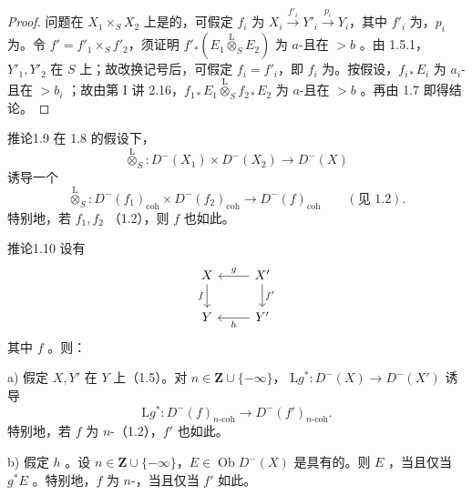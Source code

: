 \begin{proof}
问题在 $X_1\times_SX_2$ 上是的，可假定 $f_i$ 为 $X_i\xrightarrow{f'_i}Y'_i\xrightarrow{p_i}Y_i$，其中 $f'_i$ 为，$p_i$ 为。令 $f'=f'_1\times_Sf'_2$，须证明 $f'_*(E_1\mathbin{\overset{\mathrm L}{\otimes}}_SE_2)$ 为 $a$-且在 $>b$ 。由 1.5.1，$Y'_1,Y'_2$ 在 $S$ 上；故改换记号后，可假定 $f_i=f'_i$，即 $f_i$ 为。按假设，$f_{i*}E_i$ 为 $a_i$-且在 $>b_i$ ；故由第 I 讲 2.16，$f_{1*}E_1\mathbin{\overset{\mathrm L}{\otimes}}_Sf_{2*}E_2$ 为 $a$-且在 $>b$ 。再由 1.7 即得结论。
\end{proof}
\begin{SGAresult}{推论}{1.9}
在 1.8 的假设下，
\[\mathbin{\overset{\mathrm L}{\otimes}}_S:D^-(X_1)\times D^-(X_2)\longrightarrow D^-(X)\]
诱导一个
\[\mathbin{\overset{\mathrm L}{\otimes}}_S:D^-(f_1)_{\mathrm{coh}}\times D^-(f_2)_{\mathrm{coh}}\longrightarrow D^-(f)_{\mathrm{coh}}\qquad(\text{见 1.2}).\]
特别地，若 $f_1,f_2$ （1.2），则 $f$ 也如此。
\end{SGAresult}
\begin{SGAresult}{推论}{1.10}
设有
\[
\begin{tikzcd}X\arrow[d,"f"']&X'\arrow[l,"g"']\arrow[d,"f'"]\\Y&Y'\arrow[l,"h"]\end{tikzcd}
\]
其中 $f$ 。则：

a) 假定 $X,Y'$ 在 $Y$ 上（1.5）。对 $n\in\mathbf Z\cup\{-\infty\}$， $\mathrm Lg^*:D^-(X)\to D^-(X')$ 诱导
\[\mathrm Lg^*:D^-(f)_{n\text{-coh}}\longrightarrow D^-(f')_{n\text{-coh}}.\]
特别地，若 $f$ 为 $n$-（1.2），$f'$ 也如此。

b) 假定 $h$ 。设 $n\in\mathbf Z\cup\{-\infty\}$，$E\in\operatorname{Ob}D^-(X)$ 是具有的。则 $E$ ，当且仅当 $g^*E$ 。特别地，$f$ 为 $n$-，当且仅当 $f'$ 如此。
\end{SGAresult}
